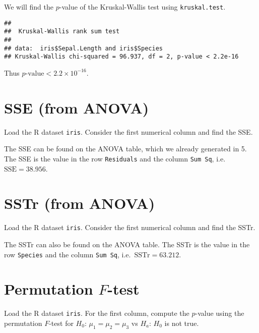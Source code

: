 \documentclass[
]{book}
\newenvironment{Shaded}{\begin{snugshade}}{\end{snugshade}}
\newcommand{\KeywordTok}[1]{\textcolor[rgb]{0.13,0.29,0.53}{\textbf{#1}}}
\newcommand{\NormalTok}[1]{#1}
\newcommand{\OperatorTok}[1]{\textcolor[rgb]{0.81,0.36,0.00}{\textbf{#1}}}
\begin{document}
We will find the \(p\)-value of the Kruskal-Wallis test
using \texttt{kruskal.test}.

\begin{Shaded}
\end{Shaded}

\begin{verbatim}
## 
##  Kruskal-Wallis rank sum test
## 
## data:  iris$Sepal.Length and iris$Species
## Kruskal-Wallis chi-squared = 96.937, df = 2, p-value < 2.2e-16
\end{verbatim}

Thus \(p\text{-value} < 2.2 \times 10^{-16}\).

\hypertarget{sse-from-anova}{%
\section{SSE (from ANOVA)}\label{sse-from-anova}}

Load the R dataset \texttt{iris}.
Consider the first numerical column and find the SSE.

The SSE can be found on the ANOVA table,
which we already generated in 5.
The SSE is the value in the row \texttt{Residuals} and the column \texttt{Sum\ Sq},
i.e.~\(\mathrm{SSE} = 38.956\).

\hypertarget{sstr-from-anova}{%
\section{SSTr (from ANOVA)}\label{sstr-from-anova}}

Load the R dataset \texttt{iris}.
Consider the first numerical column and find the SSTr.

The SSTr can also be found on the ANOVA table.
The SSTr is the value in the row \texttt{Species} and the column \texttt{Sum\ Sq},
i.e.~\(\mathrm{SSTr} = 63.212\).

\hypertarget{permutation-f-test-1}{%
\section{\texorpdfstring{Permutation \(F\)-test}{Permutation F-test}}\label{permutation-f-test-1}}

Load the R dataset \texttt{iris}.
For the first column, compute the \(p\)-value using the permutation \(F\)-test for
\(H_0\): \(\mu_1 = \mu_2 = \mu_3\) vs \(H_a\): \(H_0\) is not true.
\end{document}
